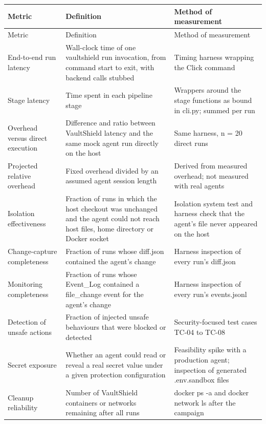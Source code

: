 \documentclass[12pt,a4paper,oneside]{report}
\providecommand{\real}[1]{#1}
\newcommand{\TableCapGap}{6pt}
\begin{document}
\par\vspace{\TableCapGap}
\noindent\begin{minipage}{\textwidth}
\label{tab:7-1}
\end{minipage}
\par
\begin{longtable}[]{@{}|
  >{\raggedright\arraybackslash}p{(\columnwidth - 7\tabcolsep) * \real{0.3333}} |
  >{\raggedright\arraybackslash}p{(\columnwidth - 7\tabcolsep) * \real{0.3333}} |
  >{\raggedright\arraybackslash}p{(\columnwidth - 7\tabcolsep) * \real{0.3333}}|@{}}
\hline
Metric & Definition & Method of measurement \\
\hline
\endfirsthead
\hline
Metric & Definition & Method of measurement \\
\hline
\endhead
\endlastfoot
End-to-end run latency & Wall-clock time of one vaultshield run invocation, from command start to exit, with backend calls stubbed & Timing harness wrapping the Click command \\\hline
Stage latency & Time spent in each pipeline stage & Wrappers around the stage functions as bound in cli.py; summed per run \\\hline
Overhead versus direct execution & Difference and ratio between VaultShield latency and the same mock agent run directly on the host & Same harness, n = 20 direct runs \\\hline
Projected relative overhead & Fixed overhead divided by an assumed agent session length & Derived from measured overhead; not measured with real agents \\\hline
Isolation effectiveness & Fraction of runs in which the host checkout was unchanged and the agent could not reach host files, home directory or Docker socket & Isolation system test and harness check that the agent's file never appeared on the host \\\hline
Change-capture completeness & Fraction of runs whose diff.json contained the agent's change & Harness inspection of every run's diff.json \\\hline
Monitoring completeness & Fraction of runs whose Event\_Log contained a file\_\allowbreak{}change event for the agent's change & Harness inspection of every run's events.jsonl \\\hline
Detection of unsafe actions & Fraction of injected unsafe behaviours that were blocked or detected & Security-focused test cases TC-04 to TC-08 \\\hline
Secret exposure & Whether an agent could read or reveal a real secret value under a given protection configuration & Feasibility spike with a production agent; inspection of generated .env.sandbox files \\\hline
Cleanup reliability & Number of VaultShield containers or networks remaining after all runs & docker ps -a and docker network ls after the campaign \\\hline\end{longtable}
\end{document}
